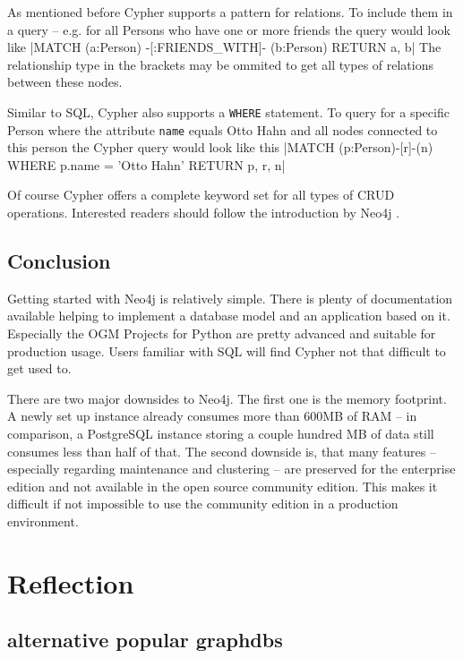 As mentioned before Cypher supports a pattern for relations.
To include them in a query -- e.g. for all Persons who have one or more friends the query would look like |MATCH (a:Person) -[:FRIENDS_WITH]- (b:Person) RETURN a, b|
The relationship type in the brackets may be ommited to get all types of relations between these nodes.

Similar to SQL, Cypher also supports a \texttt{WHERE} statement.
To query for a specific Person where the attribute \texttt{name} equals \glqq Otto Hahn\grqq{} and all nodes connected to this person the Cypher query would look like this |MATCH (p:Person)-[r]-(n) WHERE p.name = 'Otto Hahn' RETURN p, r, n|

Of course Cypher offers a complete keyword set for all types of CRUD operations. Interested readers should follow the introduction by Neo4j \autocite{neo4j:cypher_introduction}.

\subsection{Conclusion}
Getting started with Neo4j is relatively simple.
There is plenty of documentation available helping to implement a database model and an application based on it.
Especially the OGM Projects for Python are pretty advanced and suitable for production usage.
Users familiar with SQL will find Cypher not that difficult to get used to.

There are two major downsides to Neo4j. The first one is the memory footprint.
A newly set up instance already consumes more than 600MB of RAM -- in comparison, a PostgreSQL instance storing a couple hundred MB of data still consumes less than half of that.
The second downside is, that many features -- especially regarding maintenance and clustering -- are preserved for the enterprise edition and not available in the open source community edition. This makes it difficult if not impossible to use the community edition in a production environment.

\section{Reflection}
\subsection{alternative popular graphdbs}
